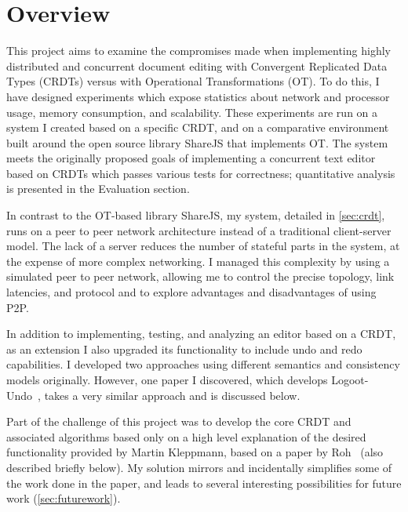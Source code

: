 \documentclass[12pt,a4paper,twoside,openright]{report}
\begin{document}
\section{Overview}
This project aims to examine the compromises made when implementing highly distributed and concurrent document editing with Convergent Replicated Data Types (CRDTs) versus with Operational Transformations (OT). To do this, I have designed experiments which expose statistics about network and processor usage, memory consumption, and scalability. These experiments are run on a system I created based on a specific CRDT, and on a comparative environment built around the open source library ShareJS that implements OT. The system meets the originally proposed goals of implementing a concurrent text editor based on CRDTs which passes various tests for correctness; quantitative analysis is presented in the Evaluation section. 

In contrast to the OT-based library ShareJS, my system, detailed in \cref{sec:crdt}, runs on a peer to peer network architecture instead of a traditional client-server model. The lack of a server reduces the number of stateful parts in the system, at the expense of more complex networking. I managed this complexity by using a simulated peer to peer network, allowing me to control the precise topology, link latencies, and protocol and to explore advantages and disadvantages of using P2P.

In addition to implementing, testing, and analyzing an editor based on a CRDT, as an extension I also upgraded its functionality to include undo and redo capabilities. I developed two approaches using different semantics and consistency models originally. However, one paper I discovered, which develops Logoot-Undo~\cite{weiss2010undo}, takes a very similar approach and is discussed below.

Part of the challenge of this project was to develop the core CRDT and associated algorithms based only on a high level explanation of the desired functionality provided by Martin Kleppmann, based on a paper by Roh~\cite{roh2011replicated} (also described briefly below). My solution mirrors and incidentally simplifies some of the work done in the paper, and leads to several interesting possibilities for future work (\cref{sec:futurework}). 

\end{document}
